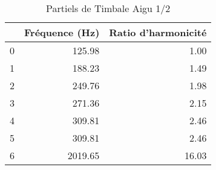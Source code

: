 \begin{table}
\centering
\caption{Partiels de Timbale Aigu 1/2}
\label{table:partiels-timbale-aigu-2.wav}
\begin{tabular}{lrr}
\toprule
{} &  Fréquence (Hz) &  Ratio d'harmonicité \\
\midrule
0 &          125.98 &                 1.00 \\
1 &          188.23 &                 1.49 \\
2 &          249.76 &                 1.98 \\
3 &          271.36 &                 2.15 \\
4 &          309.81 &                 2.46 \\
5 &          309.81 &                 2.46 \\
6 &         2019.65 &                16.03 \\
\bottomrule
\end{tabular}
\end{table}
